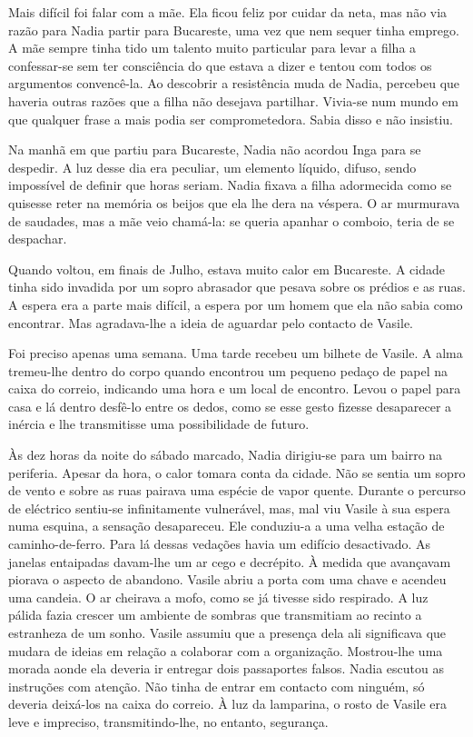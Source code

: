 Mais difícil foi falar com a mãe. Ela ficou feliz por cuidar da neta,
mas não via razão para Nadia partir para
Bucareste, uma vez que nem sequer tinha emprego. A mãe sempre tinha tido
um talento muito particular para levar a filha a confessar-se sem ter
consciência do que estava a dizer e tentou com todos os argumentos
convencê-la. Ao descobrir a resistência muda de Nadia, percebeu que
haveria outras razões que a filha não desejava partilhar. Vivia-se num mundo em que qualquer frase a mais podia ser comprometedora.
Sabia disso e não insistiu.

Na manhã em que partiu para Bucareste, Nadia não acordou Inga para se
despedir. A luz desse dia era peculiar, um elemento líquido, difuso,
sendo impossível de definir que horas seriam. Nadia fixava a filha
adormecida como se quisesse reter na memória os beijos que ela lhe dera
na véspera. O ar murmurava de saudades, mas a mãe veio chamá-la: se
queria apanhar o comboio, teria de se despachar.

Quando voltou, em finais de Julho, estava muito calor em Bucareste. A
cidade tinha sido invadida por um sopro abrasador que pesava sobre os
prédios e as ruas. A espera era a parte mais difícil, a espera por um
homem que ela não sabia como encontrar. Mas agradava-lhe a ideia de
aguardar pelo contacto de Vasile.

Foi preciso apenas uma semana. Uma tarde recebeu um bilhete de Vasile. A
alma tremeu-lhe dentro do corpo quando encontrou um pequeno pedaço de
papel na caixa do correio, indicando uma hora e um local de encontro.
Levou o papel para casa e lá dentro desfê-lo entre os dedos, como se
esse gesto fizesse desaparecer a inércia e lhe transmitisse uma
possibilidade de futuro.

Às dez horas da noite do sábado marcado, Nadia dirigiu-se para um
bairro na periferia. Apesar da hora, o calor tomara conta da cidade. Não
se sentia um sopro de vento e sobre as ruas pairava uma espécie de vapor
quente. Durante o percurso de eléctrico sentiu-se infinitamente
vulnerável, mas, mal viu Vasile à sua espera numa esquina, a sensação
desapareceu. Ele conduziu-a a uma velha estação de caminho-de-ferro.
Para lá dessas vedações havia um edifício desactivado. As janelas
entaipadas davam-lhe um ar cego e decrépito. À medida que avançavam
piorava o aspecto de abandono. Vasile abriu a porta com uma chave e
acendeu uma candeia. O ar cheirava a mofo, como se já tivesse sido
respirado. A luz pálida fazia crescer um ambiente de sombras que
transmitiam ao recinto a estranheza de um sonho. Vasile assumiu que a
presença dela ali significava que mudara de ideias em relação a
colaborar com a organização. Mostrou-lhe uma morada aonde ela deveria ir
entregar dois passaportes falsos. Nadia escutou as instruções com
atenção. Não tinha de entrar em contacto com ninguém, só deveria
deixá-los na caixa do correio. À luz da lamparina, o rosto de Vasile era
leve e impreciso, transmitindo-lhe, no entanto, segurança.


